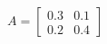 \documentclass[preview]{standalone}
\begin{document}
\begin{align*}
A = \begin{bmatrix} 0.3 & 0.1 \\ 0.2 & 0.4 \end{bmatrix}
\end{align*}
\end{document}
